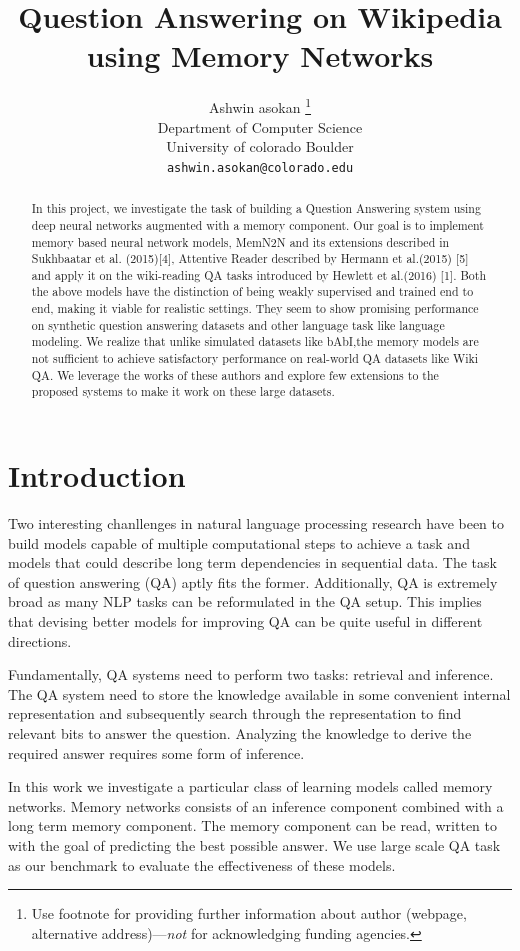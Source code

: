 \documentclass{article}
\title{Question Answering on Wikipedia using Memory Networks}
\author{
  Ashwin asokan
  \thanks{Use footnote for providing further
    information about author (webpage, alternative
    address)---\emph{not} for acknowledging funding agencies.} \\
  Department of Computer Science\\
  University of colorado Boulder\\
  \texttt{ashwin.asokan@colorado.edu} \\
}
\begin{document}

\maketitle

\begin{abstract}
  In this project, we investigate the task of building a Question Answering system using deep neural networks augmented with a memory component. Our goal is
to implement memory based neural network models, MemN2N and its extensions described in Sukhbaatar et al. (2015)[4], Attentive Reader described by Hermann et al.(2015) [5] and apply
it on the wiki-reading QA tasks introduced by Hewlett et al.(2016) [1]. Both the above models have the distinction of being weakly supervised and trained end to end, making it viable for realistic settings. They seem to show promising performance on synthetic question answering datasets and other language task like language modeling. We realize that unlike simulated datasets like bAbI,the memory models are not sufficient to achieve satisfactory performance on real-world QA datasets like Wiki QA. We leverage the works of these authors and explore few extensions to the proposed systems to make it work on these large datasets.
\end{abstract}

\section{Introduction}

Two interesting chanllenges in natural language processing research have been to build models capable of multiple computational steps to achieve a task and models that could describe long term dependencies in sequential data. The task of question answering (QA) aptly fits the former. Additionally, QA is extremely broad as many NLP tasks can be reformulated in the QA setup. This implies that devising better models for improving QA can be quite useful in different directions.

Fundamentally, QA systems need to perform two tasks: retrieval and inference. The QA system need to store the knowledge available in some convenient internal representation and subsequently search through the representation to find relevant bits to answer the question. Analyzing the knowledge to derive the required answer requires some form of inference.

In this work we investigate a particular class of learning models called memory networks. Memory networks consists of an inference component combined with a long term memory component. The memory component can be read, written to with the goal of predicting the best possible answer. We use large scale QA task as our benchmark to evaluate the effectiveness of these models. 
\end{document}
